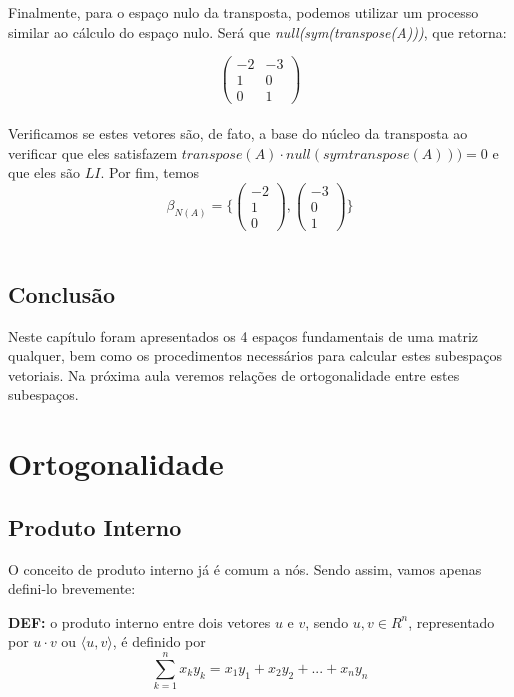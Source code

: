 \documentclass[12pt]{article}
\begin{document}
	Finalmente, para o espaço nulo da transposta, podemos utilizar um processo similar ao cálculo do espaço nulo. Será que \textit{null(sym(transpose(A)))}, que retorna:
	
	\begin{equation*}
		\begin{pmatrix}
			-2 & -3\\
			1 & 0\\
			0 & 1
		\end{pmatrix}	
	\end{equation*}\\
	
	Verificamos se estes vetores são, de fato, a base do núcleo da transposta ao verificar que eles satisfazem $transpose(A)\cdot null(symtranspose(A)))=0$ e que eles são $LI$. Por fim, temos
	\begin{equation*}
		\beta_{N(A)}= \{
		\begin{pmatrix}
			-2\\
			1\\
			0
		\end{pmatrix},
		\begin{pmatrix}
			-3\\
			0\\
			1
		\end{pmatrix}	\}
	\end{equation*}\\
	
	\subsection{Conclusão}
	Neste capítulo foram apresentados os 4 espaços fundamentais de uma matriz qualquer, bem como os procedimentos necessários para calcular estes subespaços vetoriais. Na próxima aula veremos relações de ortogonalidade entre estes subespaços.
	
	\section{Ortogonalidade}
	\subsection{Produto Interno}
	O conceito de produto interno já é comum a nós. Sendo assim, vamos apenas defini-lo brevemente:
	
	\textbf{DEF:} o produto interno entre dois vetores $u$ e $v$, sendo $u,v\in R^{n}$, representado por $u\cdot v$ ou $\langle u,v \rangle$, é definido por
	\begin{equation*}
		\sum_{k=1}^{n}x_k y_k=x_1 y_1+x_2 y_2+...+x_n y_n
	\end{equation*}
	
\end{document}

